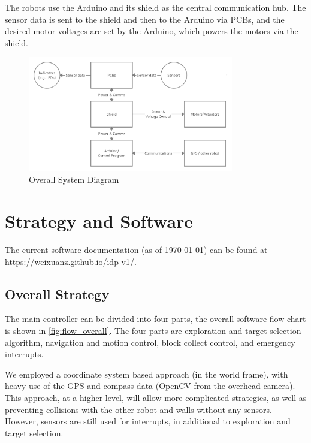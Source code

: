 The robots use the Arduino and its shield as the central communication hub. The sensor data is sent to the shield and then to the Arduino via PCBs, and the desired motor voltages are set by the Arduino, which powers the motors via the shield.


\begin{figure}[H]
    \centering
    \includegraphics[width = 0.8\textwidth]{SystemDiagram.png}
    \caption{Overall System Diagram}
\end{figure}





\section{Strategy and Software}

The current software documentation (as of \today) can be found at \url{https://weixuanz.github.io/idp-v1/}.

\subsection{Overall Strategy}
\label{sec:software_flow_chart}

The main controller can be divided into four parts, the overall software flow chart is shown in \cref{fig:flow_overall}. The four parts are exploration and target selection algorithm, navigation and motion control, block collect control, and emergency interrupts.

We employed a coordinate system based approach (in the world frame), with heavy use of the GPS and compass data (OpenCV from the overhead camera). This approach, at a higher level, will allow more complicated strategies, as well as preventing collisions with the other robot and walls without any sensors. However, sensors are still used for interrupts, in additional to exploration and target selection.

